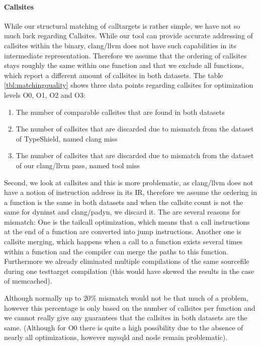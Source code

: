 \paragraph{Callsites} While our structural matching of calltargets is rather simple, we have not so much luck regarding Callsites. While our tool can provide accurate addressing of callsites within the binary, clang/llvm does not have such capabilities in its intermediate representation. Therefore we assume that the ordering of callsites stays roughly the same within one function and that we exclude all functions, which report a different amount of callsites in both datasets.
The table \ref{tbl:matchingquality} shows three data points regarding callsites for optimization levels O0, O1, O2 and O3:
\begin{enumerate}
\item The number of comparable callsites that are found in both datasets
\item The number of callsites that are discarded due to mismatch from the dataset of TypeShield, named clang miss
\item The number of callsites that are discarded due to mismatch from the dataset of our clang/llvm pass, named tool miss
\end{enumerate}


Second, we look at callsites and this is more problematic, as clang/llvm does not have a notion of instruction address in its IR, therefore we assume the ordering in a function is the same in both datasets and when the callsite count is not the same for dyninst and clang/padyn, we discard it. The are several reasons for mismatch: One is the tailcall optimization, which means that a call instructions at the end of a function are converted into jump instructions. Another one is callsite merging, which happens when a call to a function exists several times within a function and the compiler can merge the paths to this function.
Furthermore we already eliminated multiple compilations of the same sourcefile during one testtarget compilation (this would have skewed the results in the case of memcached).

Although normally up to 20\% mismatch would not be that much of a problem, however this percentage is only based on the number of callsites per function and we cannot really give any guarantees that the callsites in both datasets are the same. (Although for O0 there is quite a high possibility due to the absence of nearly all optimizations, however mysqld and node remain problematic).


